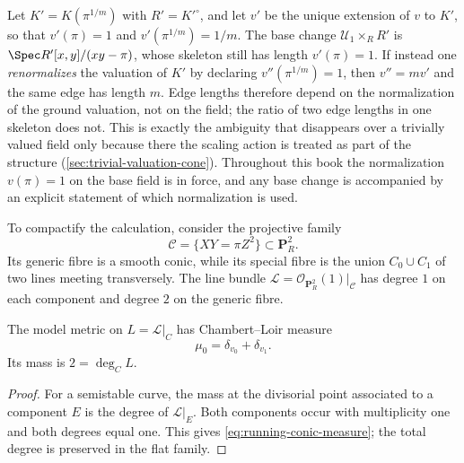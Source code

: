 \begin{remark}
\label{rem:ch08-base-change-lengths}
Let $K'=K(\pi^{1/m})$ with $R'=K'^\circ$, and let $v'$ be the unique
extension of $v$ to $K'$, so that $v'(\pi)=1$ and
$v'(\pi^{1/m})=1/m$.  The base change $\mathcal U_1\times_RR'$ is
$\Spec R'[x,y]/(xy-\pi)$, whose skeleton still has length
$v'(\pi)=1$.  If instead one \emph{renormalizes} the valuation of $K'$ by
declaring $v''(\pi^{1/m})=1$, then $v''=mv'$ and the same edge has length
$m$.  Edge lengths therefore depend on the normalization of the ground
valuation, not on the field; the ratio of two edge lengths in one skeleton
does not.  This is exactly the ambiguity that disappears over a trivially
valued field only because there the scaling action is treated as part of the
structure (\cref{sec:trivial-valuation-cone}).  Throughout this book the
normalization $v(\pi)=1$ on the base field is in force, and any base change
is accompanied by an explicit statement of which normalization is used.
\end{remark}

To compactify the calculation, consider the projective family
\begin{equation}
\label{eq:running-conic}
             \mathcal C=\{XY=\pi Z^2\}\subset\mathbf P^2_R.
\end{equation}
Its generic fibre is a smooth conic, while its special fibre is the union
$C_0\cup C_1$ of two lines meeting transversely.  The line bundle
$\mathcal L=\mathcal O_{\mathbf P^2_R}(1)|_{\mathcal C}$ has degree $1$ on
each component and degree $2$ on the generic fibre.

\begin{proposition}\label{prop:running-conic-measure}
The model metric on $L=\mathcal L|_{C}$ has Chambert--Loir measure
\begin{equation}
\label{eq:running-conic-measure}
                              \mu_0=\delta_{v_0}+\delta_{v_1}.
\end{equation}
Its mass is $2=\deg_C L$.
\end{proposition}

\begin{proof}
For a semistable curve, the mass at the divisorial point associated to a
component $E$ is the degree of $\mathcal L|_E$.  Both components occur with
multiplicity one and both degrees equal one.  This gives
\eqref{eq:running-conic-measure}; the total degree is preserved in the flat
family.
\end{proof}

